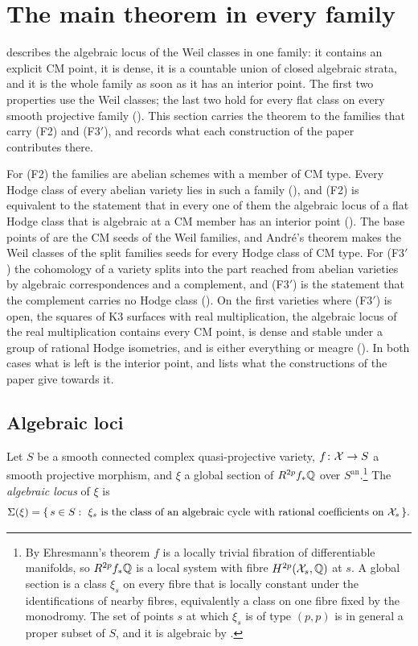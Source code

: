 \section{The main theorem in every family}\label{sec:families}

 describes the algebraic locus of the Weil classes in one
family: it contains an explicit CM point, it is dense, it is a countable union
of closed algebraic strata, and it is the whole family as soon as it has an
interior point. The first two properties use the Weil classes; the last two
hold for every flat class on every smooth projective family
(). This section carries the theorem to the families that
carry (F2) and
\textup{(F3$'$)}, and records what each construction of the paper
contributes there.

For (F2) the families are abelian schemes with a member of CM type. Every
Hodge class of every abelian variety lies in such a family
(), and (F2) is equivalent to the statement that in every
one of them the algebraic locus of a flat Hodge class that is algebraic at a
CM member has an interior point (). The base points
of  are the CM seeds of the Weil families, and
Andr\'e's theorem makes the Weil classes of the split families seeds for every
Hodge class of CM type. For \textup{(F3$'$)} the cohomology of a variety splits
into the part reached from abelian varieties by algebraic correspondences and
a complement, and \textup{(F3$'$)} is the statement that the complement
carries no Hodge class (). On the first varieties where
\textup{(F3$'$)} is open, the squares of K3 surfaces with real
multiplication, the algebraic locus of the real multiplication contains every
CM point, is dense and stable under a group of rational Hodge isometries, and
is either everything or meagre (). In both cases what is
left is the interior point, and  lists what the
constructions of the paper give towards it.

\subsection{Algebraic loci}\label{ssec:algloci}

\begin{definition}\label{def:algloc}
Let $S$ be a smooth connected complex quasi-projective variety,
$f\colon\mathcal{X}\to S$ a smooth projective morphism, and $\xi$ a global section of
$R^{2p}f_{*}\mathbb{Q}$ over $S^{\mathrm{an}}$.\footnote{By Ehresmann's theorem $f$
is a locally trivial fibration of differentiable manifolds, so
$R^{2p}f_{*}\mathbb{Q}$ is a local system with fibre $H^{2p}(\mathcal{X}_{s},\mathbb{Q})$ at $s$. A
global section is a class $\xi_{s}$ on every fibre that is locally constant
under the identifications of nearby fibres, equivalently a class on one fibre
fixed by the monodromy. The set of points $s$ at which $\xi_{s}$ is of type
$(p,p)$ is in general a proper subset of $S$, and it is algebraic by
.} The \emph{algebraic locus} of $\xi$
is
\[
  \Sigma(\xi)=\{\,s\in S:\ \xi_{s}\ \text{is the class of an algebraic cycle
  with rational coefficients on}\ \cX_{s}\,\}.
\]
\end{definition}

